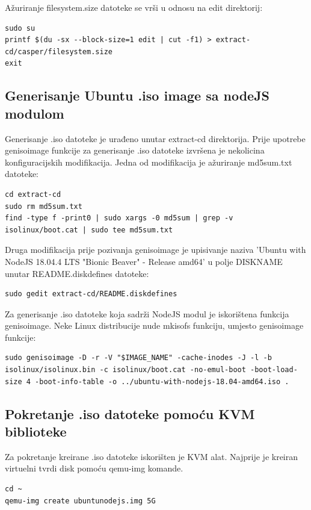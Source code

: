 \documentclass[12pt,vi]{mitthesis}
\begin{document}
\noindent
Ažuriranje filesystem.size datoteke se vrši u odnosu na edit direktorij:
\begin{lstlisting}[style=BashInputStyle]
sudo su
printf $(du -sx --block-size=1 edit | cut -f1) > extract-cd/casper/filesystem.size
exit
\end{lstlisting}

\subsection*{Generisanje Ubuntu .iso image sa nodeJS modulom}
\noindent
Generisanje .iso datoteke je urađeno unutar extract-cd direktorija. Prije upotrebe genisoimage funkcije za generisanje .iso datoteke izvršena je nekolicina konfiguracijskih modifikacija.
Jedna od modifikacija je ažuriranje md5sum.txt datoteke:
\begin{lstlisting}[style=BashInputStyle]
cd extract-cd
sudo rm md5sum.txt
find -type f -print0 | sudo xargs -0 md5sum | grep -v isolinux/boot.cat | sudo tee md5sum.txt
\end{lstlisting}
\noindent
Druga modifikacija prije pozivanja genisoimage je upisivanje naziva 'Ubuntu with NodeJS 18.04.4 LTS "Bionic Beaver" - Release amd64' u polje DISKNAME unutar README.diskdefines datoteke:
\begin{lstlisting}[style=BashInputStyle]
sudo gedit extract-cd/README.diskdefines
\end{lstlisting}

\noindent
Za generisanje .iso datoteke koja sadrži NodeJS modul je iskorištena funkcija genisoimage. Neke Linux distribucije nude mkisofs funkciju, umjesto genisoimage funkcije:
\begin{lstlisting}[style=BashInputStyle]
sudo genisoimage -D -r -V "$IMAGE_NAME" -cache-inodes -J -l -b isolinux/isolinux.bin -c isolinux/boot.cat -no-emul-boot -boot-load-size 4 -boot-info-table -o ../ubuntu-with-nodejs-18.04-amd64.iso .
\end{lstlisting}

\subsection*{Pokretanje .iso datoteke pomoću KVM biblioteke}
\indent
Za pokretanje kreirane .iso datoteke iskorišten je KVM alat. Najprije je kreiran virtuelni tvrdi disk pomoću qemu-img komande.
\begin{lstlisting}[style=BashInputStyle]
cd ~
qemu-img create ubuntunodejs.img 5G
\end{lstlisting}
\end{document}
